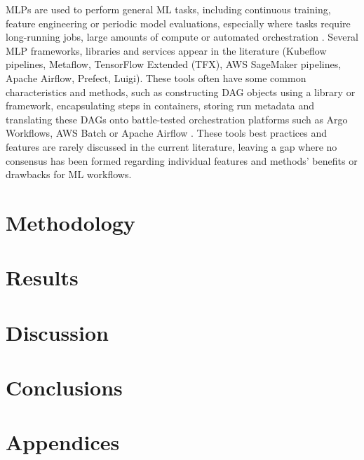 \documentclass[12pt]{article}
\begin{document}
MLPs are used to perform general ML tasks, including continuous training, feature engineering or periodic model evaluations, especially where tasks require long-running jobs, large amounts of compute or automated orchestration \citep{shankarOperationalizingMachineLearning2022, tuulosEffectiveDataScience2022, kreuzbergerMachineLearningOperations2022}. Several MLP frameworks, libraries and services appear in the literature (Kubeflow pipelines, Metaflow, TensorFlow Extended (TFX), AWS SageMaker pipelines, Apache Airflow, Prefect, Luigi). These tools often have some common characteristics and methods, such as constructing DAG objects using a library or framework, encapsulating steps in containers, storing run metadata and translating these DAGs onto battle-tested orchestration platforms such as Argo Workflows, AWS Batch or Apache Airflow \citep{tagliabueReasonableScaleMachine2023, tuulosEffectiveDataScience2022, muiruriPracticesInfrastructuresMachine2022}. These tools best practices and features are rarely discussed in the current literature, leaving a gap where no consensus has been formed regarding individual features and methods' benefits or drawbacks for ML workflows.
\pagebreak

\section{Methodology}
\pagebreak

\section{Results}
\pagebreak

\section{Discussion}
\pagebreak

\section{Conclusions}
\pagebreak

\section{Appendices}
\pagebreak

\printbibliography
\end{document}
